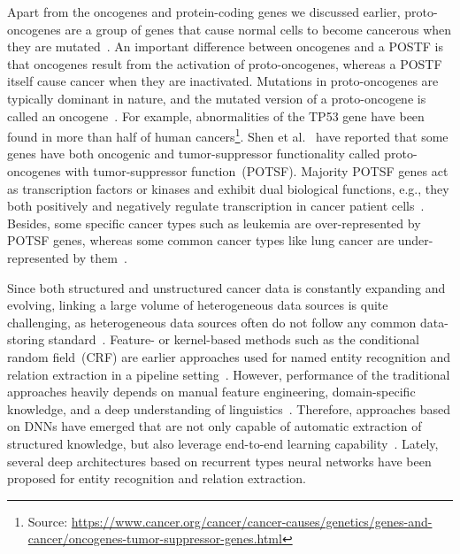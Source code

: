 \hspace*{3.5mm} Apart from the oncogenes and protein-coding genes we discussed earlier, proto-oncogenes are a group of genes that cause normal cells to become cancerous when they are mutated~\cite{slamon1987proto}. An important difference between oncogenes and a POSTF is that oncogenes result from the activation of proto-oncogenes, whereas a POSTF itself cause cancer when they are inactivated. Mutations in proto-oncogenes are typically dominant in nature, and the mutated version of a proto-oncogene is called an oncogene~\cite{slamon1987proto}. For example, abnormalities of the TP53 gene have been found in more than half of human cancers\footnote{Source: \url{https://www.cancer.org/cancer/cancer-causes/genetics/genes-and-cancer/oncogenes-tumor-suppressor-genes.html}}. \hspace*{3.5mm} Shen et al.~\cite{POSTF} have reported that some genes have both oncogenic and tumor-suppressor functionality called proto-oncogenes with tumor-suppressor function~(POTSF). Majority POTSF genes act as transcription factors or kinases and exhibit dual biological functions, e.g., they both positively and negatively regulate transcription in cancer patient cells~\cite{POSTF}. Besides, some specific cancer types such as leukemia are over-represented by POTSF genes, whereas some common cancer types like lung cancer are under-represented by them~\cite{POSTF}. 

\hspace*{3.5mm} Since both structured and unstructured cancer data is constantly expanding and evolving, linking a large volume of heterogeneous data sources is quite challenging, as heterogeneous data sources often do not follow any common data-storing standard~\cite{hasan2020knowledge}. Feature- or kernel-based methods such as the conditional random field~(CRF) are earlier approaches used for named entity recognition and relation extraction in a pipeline setting~\cite{xue2019fine}. However, performance of the traditional approaches heavily depends on manual feature engineering, domain-specific knowledge, and a deep understanding of linguistics~\cite{xue2019fine}. Therefore, approaches based on DNNs have emerged that are not only capable of automatic extraction of structured knowledge, but also leverage end-to-end learning capability~\cite{dogan2019fine}. Lately, several deep architectures based on recurrent types neural networks have been proposed for entity recognition and relation extraction. 

